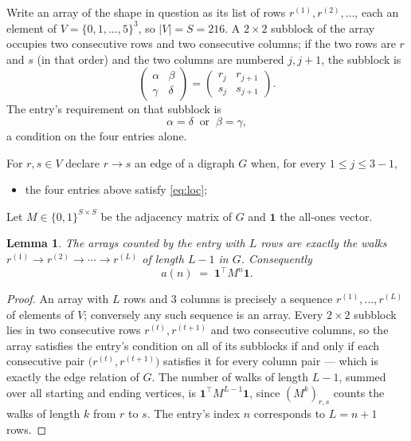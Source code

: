 \documentclass[11pt,a4paper]{article}
\theoremstyle{plain}
\newtheorem{lemma}[theorem]{Lemma}
\theoremstyle{definition}
\begin{document}
Write an array of the shape in question as its list of rows
$r^{(1)},r^{(2)},\dots$, each an element of
$V=\{0,1,\dots,5\}^{3}$, so $|V|=S=216$. A $2\times2$ subblock of the array
occupies two consecutive rows and two consecutive columns; if the two rows are $r$
and $s$ (in that order) and the two columns are numbered $j,j+1$,
the subblock is
\[
\begin{pmatrix}\alpha&\beta\\\gamma&\delta\end{pmatrix}=\begin{pmatrix}r_j&r_{j+1}\\s_j&s_{j+1}\end{pmatrix}.
\]
The entry's requirement on that subblock is
\begin{equation}\label{eq:loc}
\alpha=\delta\ \text{ or }\ \beta=\gamma,
\end{equation}
a condition on the four entries alone.

For $r,s\in V$ declare $r\to s$ an edge of a digraph $G$ when, for every
$1\le j\le 3-1$,
\begin{itemize}
\item the four entries above satisfy \eqref{eq:loc};

\end{itemize}
Let $M\in\{0,1\}^{S\times S}$ be the adjacency matrix of $G$ and $\mathbf{1}$ the
all-ones vector.

\begin{lemma}\label{lem:walk}
The arrays counted by the entry with $L$ rows are exactly the walks
$r^{(1)}\to r^{(2)}\to\cdots\to r^{(L)}$ of length $L-1$ in $G$. Consequently
\[
a(n)\;=\;\mathbf{1}^{\!\top}M^{n}\mathbf{1} .
\]
\end{lemma}

\begin{proof}
An array with $L$ rows and $3$ columns is precisely a sequence
$r^{(1)},\dots,r^{(L)}$ of elements of $V$; conversely any such sequence is an array.
Every $2\times2$ subblock lies in two consecutive rows $r^{(t)},r^{(t+1)}$ and two
consecutive columns, so the array satisfies the entry's condition on all of its subblocks
if and only if each consecutive pair $\bigl(r^{(t)},r^{(t+1)}\bigr)$ satisfies it for
every column pair --- which is exactly the edge relation of $G$. The number of walks of
length $L-1$, summed over all starting and ending vertices, is
$\mathbf{1}^{\!\top}M^{L-1}\mathbf{1}$, since $(M^{k})_{r,s}$ counts the walks of
length $k$ from $r$ to $s$. The entry's index $n$ corresponds to $L=n+1$ rows.
\end{proof}
\end{document}
